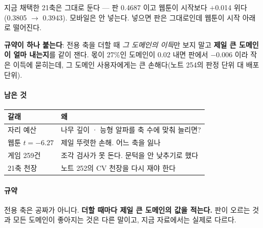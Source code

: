 \documentclass[10pt]{article}
\begin{document}
지금 채택한 21축은 그대로 둔다 --- 판 0.4687 이고 웹툰이 시작보다 $+$0.014
위다(0.3805 $\to$ 0.3943). 모바일은 안 넣는다. 넣으면 판은 그대로인데 웹툰이
시작 아래로 떨어진다.

\textbf{규약이 하나 붙는다}: 전용 축을 더할 때 \emph{그 도메인의 이득}만
보지 말고 \textbf{제일 큰 도메인이 얼마 내는지}를 같이 잰다. 몫이 27\%인
도메인이 0.02 내면 판에서 $-$0.006 이라 작은 이득에 묻히는데, 그 도메인
사용자에게는 큰 손해다(노트 254의 판정 단위 대 배포 단위).

\paragraph{남은 것}
\begin{center}\small
\begin{tabular}{ll}
\hline
갈래 & 왜 \\
\hline
자리 예산 & 나무 깊이 · 능형 알파를 축 수에 맞춰 늘리면? \\
웹툰 $t{=}-6.27$ & 제일 뚜렷한 손해. 어느 축을 잃나 \\
게임 259건 & 조각 검사가 못 돈다. 문턱을 안 낮추기로 했다 \\
21축 천장 & 노트 252의 CV 천장을 다시 재야 한다 \\
\hline
\end{tabular}
\end{center}

\paragraph{규약} 전용 축은 공짜가 아니다. \textbf{더할 때마다 제일 큰
도메인의 값을 적는다.} 판이 오르는 것과 모든 도메인이 좋아지는 것은 다른
말이고, 지금 자료에서는 실제로 다르다.
\end{document}
